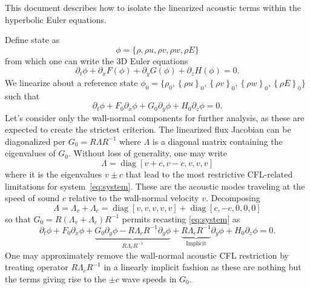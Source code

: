 \documentclass[letterpaper,11pt,nointlimits,reqno]{amsart}
\begin{document}
This document describes how to isolate the linearized
acoustic terms within the hyperbolic Euler equations.

Define state as
\begin{equation}
 \phi = \{\rho, \rho u, \rho v, \rho w, \rho E \}
\end{equation}
from which one can write the 3D Euler equations
\begin{equation}
 \partial_t \phi + \partial_x F(\phi) + \partial_y G(\phi) + \partial_z
  H(\phi) = 0
  .
\end{equation}
We linearize about a reference state $\phi_0 = \{\rho_0, \left\{\rho
u\right\}_0, \left\{\rho v\right\}_0, \left\{\rho w\right\}_0, \left\{\rho
E\right\}_0 \}$ such that
\begin{equation}\label{eq:system}
 \partial_t \phi +  F_0 \partial_x \phi + G_0 \partial_y \phi + H_0 \partial_z
  \phi = 0
  .
\end{equation}
Let's consider only the wall-normal components for further analysis, as these
are expected to create the strictest criterion.  The linearized flux Jacobian
can be diagonalized per $G_0 = R \Lambda R^{-1}$ where $\Lambda$ is a diagonal
matrix containing the eigenvalues of $G_0$.  Without loss of generality, one
may write
\begin{equation}
  \Lambda = \operatorname{diag}\left[v+c,v-c,v,v,v\right]
\end{equation}
where it is the eigenvalues $v\pm{}c$ that lead to the most restrictive
CFL-related limitations for system~\eqref{eq:system}.  These are the acoustic
modes traveling at the speed of sound $c$ relative to the wall-normal velocity
$v$.  Decomposing
\begin{equation}\label{eq:eigdecomp}
  \Lambda = \Lambda_v + \Lambda_c =
  \operatorname{diag}\left[v,v,v,v,v\right]
  +
  \operatorname{diag}\left[c,-c,0,0,0\right]
\end{equation}
so that $ G_0 = R \left(\Lambda_v + \Lambda_c\right) R^{-1} $ permits recasting
\eqref{eq:system} as
\begin{equation}
    \partial_t \phi
 +  F_0 \partial_x \phi
 +  \underbrace{
      G_0 \partial_y \phi - R \Lambda_c R^{-1} \partial_y \phi
    }_{R \Lambda_v R^{-1}}
 +  \underbrace{R \Lambda_c R^{-1}}_{\text{Implicit}} \partial_y \phi
 +  H_0 \partial_z \phi
  = 0
  .
\end{equation}
One may approximately remove the wall-normal acoustic CFL restriction by
treating operator $R \Lambda_c R^{-1}$ in a linearly implicit fashion as these
are nothing but the terms giving rise to the $\pm{}c$ wave speeds in $G_0$.
\end{document}
